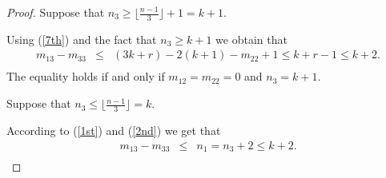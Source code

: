 \documentclass[10pt,a4paper]{amsart}
\begin{document}
\begin{proof}
\medskip

Suppose that $n_3\geq \lfloor \frac{n-1}{3} \rfloor+1=k+1$.

Using (\ref{7th}) and the fact that $n_3\geq k+1$ we obtain that 
\begin{eqnarray}
\label{inequality2}
m_{13}-m_{33}&\leq& (3k+r)-2(k+1)-m_{22}+1\leq k+r-1\leq k+2.\\\nonumber
\end{eqnarray}
The equality holds if and only if $m_{12}=m_{22}=0$ and $n_3=k+1$.

\medskip

Suppose that $n_3\leq \lfloor \frac{n-1}{3} \rfloor=k$.

According to (\ref{1st}) and (\ref{2nd}) we get that
\begin{eqnarray}
\label{inequality1}
    m_{13}-m_{33}&\leq & n_1=n_3+2\leq k+2.\\\nonumber
\end{eqnarray}


\end{proof}
\end{document}
